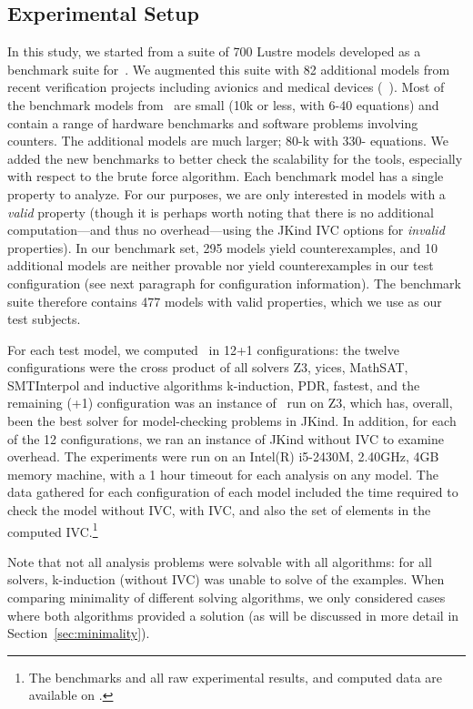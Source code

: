 \subsection{Experimental Setup}
In this study, we started from a suite of 700 Lustre models developed as a benchmark suite for~\cite{Hagen08:FMCAD}.  We augmented this suite with 82 additional models from recent verification projects including avionics and medical devices (~\cite{QFCS15:backes,hilt2013}).  Most of the benchmark models from~\cite{Hagen08:FMCAD} are small (10k or less, with 6-40 equations) and contain a range of hardware benchmarks and software problems involving counters.  The additional models are much larger; 80-k with 330- equations.  We added the new benchmarks to better check the scalability for the tools, especially with respect to the brute force algorithm.
%
Each benchmark model has a single property to analyze.  For our purposes, we are only interested in models with a {\em valid} property (though it is perhaps worth noting that there is no additional computation---and thus no overhead---using the JKind IVC options for {\em invalid} properties).  In our benchmark set, 295 models yield counterexamples, and 10 additional models are neither provable nor yield counterexamples in our test configuration (see next paragraph for configuration information).  The benchmark suite therefore contains 477 models with valid properties, which we use as our test subjects.

For each test model, we computed \ucalg\ in 12+1 configurations: the twelve configurations were the cross product of all solvers {Z3, yices, MathSAT, SMTInterpol} and inductive algorithms {k-induction, PDR, fastest}, and the remaining (+1) configuration was an instance of \bfalg\ run on Z3, which has, overall, been the best solver for model-checking problems in JKind.  In addition, for each of the 12 configurations, we ran an instance of JKind without IVC to examine overhead.  The experiments were run on an Intel(R) i5-2430M, 2.40GHz, 4GB memory machine, with a 1 hour timeout for each analysis on any model.  The data gathered for each configuration of each model included the time required to check the model without IVC, with IVC, and also the set of elements in the computed IVC.\footnote{The benchmarks and all raw experimental results, and computed data are available on \cite{expr}.}

Note that not all analysis problems were solvable with all algorithms: for all solvers, k-induction (without IVC) was unable to solve  of the examples.  When comparing minimality of different solving algorithms, we only considered cases where both algorithms provided a solution (as will be discussed in more detail in Section~\ref{sec:minimality}).

